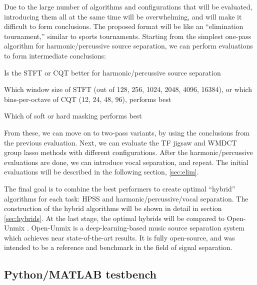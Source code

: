 \documentclass[letter,12pt]{article}
\newenvironment{tight_itemize}{
\begin{itemize}
  \setlength{\itemsep}{0pt}
  \setlength{\parskip}{0pt}
}{\end{itemize}}
\begin{document}
Due to the large number of algorithms and configurations that will be evaluated, introducing them all at the same time will be overwhelming, and will make it difficult to form conclusions. The proposed format will be like an ``elimination tournament,'' similar to sports tournaments. Starting from the simplest one-pass algorithm for harmonic/percussive source separation, we can perform evaluations to form intermediate conclusions:

\begin{tight_itemize}
\item
	Is the STFT or CQT better for harmonic/percussive source separation
\item
	Which window size of STFT (out of 128, 256, 1024, 2048, 4096, 16384), or which bins-per-octave of CQT (12, 24, 48, 96), performs best
\item
	Which of soft or hard masking performs best
\end{tight_itemize} 

From these, we can move on to two-pass variants, by using the conclusions from the previous evaluation. Next, we can evaluate the TF jigsaw and WMDCT group lasso methods with different configurations. After the harmonic/percussive evaluations are done, we can introduce vocal separation, and repeat. The initial evaluations will be described in the following section, \ref{sec:elim}.

The final goal is to combine the best performers to create optimal ``hybrid'' algorithms for each task: HPSS and harmonic/percussive/vocal separation. The construction of the hybrid algorithms will be shown in detail in section \ref{sec:hybrids}. At the last stage, the optimal hybrids will be compared to Open-Unmix \cite{umx}. Open-Unmix is a deep-learning-based music source separation system which achieves near state-of-the-art results. It is fully open-source, and was intended to be a reference and benchmark in the field of signal separation.

\subsection{Python/MATLAB testbench}
\end{document}
